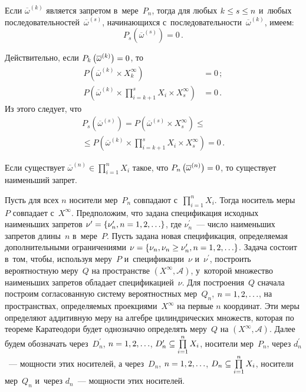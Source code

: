 \begin{multicols}{2}
    Если $\overline{\omega}^{(k)}$ является запретом в~мере~$P_n$, тогда для
любых $k\hm\leq s\hm\leq n$ и~любых
последовательностей~$\overline{\omega}^{(s)}$, начинающихся
с~последовательности~$\overline{\omega}^{(k)}$, имеем:
    $$
    P_s\left( \overline{\omega}^{(s)}\right)=0\,.
    $$

    Действительно, если $P_k\left(\overline{\omega}^{(k)}\right)\hm=0$, то
\begin{align*}
    P\left( \overline{\omega}^{(k)} \times X_k^\infty \right)&=0\,;
\\
P\left( \overline{\omega}^{(k)} \times \prod\limits_{i=k+1}^s X_i\times X_s^\infty
     \right)&=0\,.
    \end{align*}
Из этого следует, что
\begin{multline*}
P_s\left(\overline{\omega}^{(s)}\right) = P\left( \overline{\omega}^{(s)}\times
X_s^\infty\right) \leq{}\\
{}\leq P\left( \overline{\omega}^{(k)} \times
\prod\limits_{i=k+1}^s X_i\times X_s^\infty\right)=0\,.
\end{multline*}

    Если существует  $\overline{\omega}^{(n)} \in \prod\limits_{i=1}^n X_i$
    такое, что $P_n\left(\overline{\omega}^{(n)}\right)\hm=0$, то существует
наименьший запрет.

    Пусть для всех $n$ носители мер~$P_n$ совпадают с~$\prod\limits_{i=1}^n
X_i$. Тогда носитель меры~$P$ совпадает с~$X^\infty$. Предположим, что
задана спецификация исходных наименьших запретов
$\nu^\prime\hm= \{\nu^\prime_n, n\hm= 1,2,\ldots\}$, где
$\nu^\prime_n$~--- число наименьших запретов длины~$n$ в~мере~$P$. Пусть задана новая
спецификация, определяемая дополнительными ограничениями
$\nu\hm= \{\nu_n, \nu_n\hm\geq \nu_n^\prime, n\hm= 1,2,\ldots\}$.
Задача состоит в~том, чтобы, используя меру~$P$
и~спецификации~$\nu$   и~$\nu^\prime$, построить вероятностную меру~$Q$ на пространстве
$(X^\infty, \mathcal{A})$, у~которой множество наименьших запретов обладает
спецификацией~$\nu$. Для построения~$Q$ сначала построим согласованную
систему вероятностных мер~$Q_n$, $n\hm= 1,2,\ldots$, на пространствах,
определяемых проекциями~$X^\infty$ на первые $n$ координат. Эти меры
определяют аддитивную меру на алгебре цилиндрических множеств, которая по
теореме Каратеодори будет однозначно определять меру~$Q$ на $(X^\infty,
\mathcal{A})$. Далее будем обозначать через~$D^\prime_n$, $n\hm=1, 2,\ldots$,
$D_n^\prime\hm\subseteq \prod\limits_{i=1}^n X_i$, носители мер~$P_n$, через
$d_n^\prime$~--- мощности этих носителей, а через~$D_n$, $n\hm=1, 2,\ldots$,
$D_n\hm\subseteq \prod\limits_{i=1}^n X_i$, носители мер~$Q_n$ и~через
$d_n$~--- мощности этих носителей.


\end{multicols}
